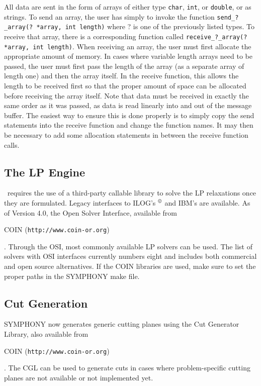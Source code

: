 All data are sent in the form of arrays of either type {\tt char}, {\tt int},
or {\tt double}, or as strings. To send an array, the user has simply to
invoke the function {\tt send\_?\_array(? *array, int length)} where ?  is one
of the previously listed types. To receive that array, there is a
corresponding function called {\tt receive\_?\_array(?  *array, int
length)}. When receiving an array, the user must first allocate the
appropriate amount of memory. In cases where variable length arrays need to be
passed, the user must first pass the length of the array (as a separate array
of length one) and then the array itself. In the receive function, this allows
the length to be received first so that the proper amount of space can be
allocated before receiving the array itself. Note that data must be received
in exactly the same order as it was passed, as data is read linearly into and
out of the message buffer. The easiest way to ensure this is done properly is
to simply copy the send statements into the receive function and change the
function names. It may then be necessary to add some allocation statements in
between the receive function calls.

\subsection{The LP Engine}

\BB\ requires the use of a third-party callable library to solve the LP 
relaxations once they are formulated. Legacy interfaces to ILOG's
$^{\copyright}$
and IBM's
are available. As of Version 4.0, the Open Solver Interface, available from
\begin{latexonly} 
COIN (\texttt{http://www.coin-or.org})
\end{latexonly}.
Through the OSI, most commonly available LP solvers can be used. The list of
solvers with OSI interfaces currently numbers eight and includes both
commercial and open source alternatives. If the COIN libraries are used, make
sure to set the proper paths in the SYMPHONY make file.

\subsection{Cut Generation}

SYMPHONY now generates generic cutting planes using the Cut Generator Library,
also available from 
\begin{latexonly} 
COIN (\texttt{http://www.coin-or.org})
\end{latexonly}.
The CGL can be used to generate cuts in cases where problem-specific cutting
planes are not available or not implemented yet. 

